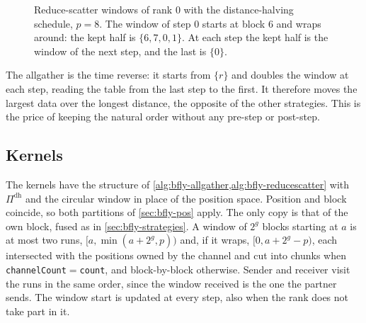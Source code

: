 \begin{figure}[t]
\centering
{}
\caption{Reduce-scatter windows of rank $0$ with the distance-halving schedule, $p=8$. The window of step $0$ starts at block $6$ and wraps around: the kept half is $\{6,7,0,1\}$. At each step the kept half is the window of the next step, and the last is $\{0\}$.}
\label{fig:bfly-circular}
\end{figure}

The allgather is the time reverse: it starts from $\{r\}$ and doubles the window at each step, reading the table from the last step to the first.
It therefore moves the largest data over the longest distance, the opposite of the other strategies. This is the price of keeping the natural order without any pre-step or post-step.

\subsection{Kernels}

The kernels have the structure of \cref{alg:bfly-allgather,alg:bfly-reducescatter} with $\Pi^{\mathrm{dh}}$ and the circular window in place of the position space.
Position and block coincide, so both partitions of \cref{sec:bfly-pos} apply.
The only copy is that of the own block, fused as in \cref{sec:bfly-strategies}.
A window of $2^g$ blocks starting at $a$ is at most two runs, $[a,\min(a+2^g,p))$ and, if it wraps, $[0,a+2^g-p)$, each intersected with the positions owned by the channel and cut into chunks when \texttt{channelCount}$=$\texttt{count}, and block-by-block otherwise.
Sender and receiver visit the runs in the same order, since the window received is the one the partner sends.
The window start is updated at every step, also when the rank does not take part in it.

